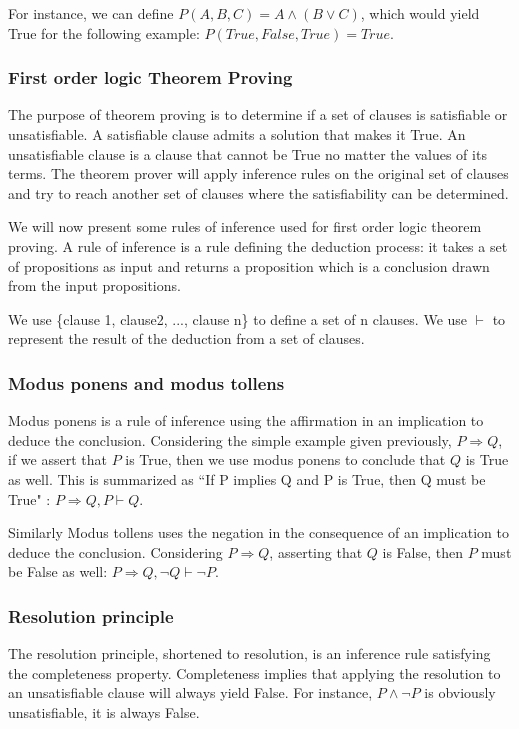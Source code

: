 For instance, we can define $P(A,B,C) = A \wedge (B \vee C)$, which would yield True for the following example: $P(True,False,True)=True$.

\subsubsection{First order logic Theorem Proving}
The purpose of theorem proving is to determine if a set of clauses is satisfiable or unsatisfiable.
A satisfiable clause admits a solution that makes it True.
An unsatisfiable clause is a clause that cannot be True no matter the values of its terms.
The theorem prover will apply inference rules on the original set of clauses and try to reach another set of clauses where the satisfiability can be determined.

We will now present some rules of inference used for first order logic theorem proving.
A rule of inference is a rule defining the deduction process: it takes a set of propositions as input and returns a proposition which is a conclusion drawn from the input propositions.

We use \{clause 1, clause2, ..., clause n\} to define a set of n clauses.
We use $\vdash$ to represent the result of the deduction from a set of clauses.

\subsubsection{Modus ponens and modus tollens}
Modus ponens is a rule of inference using the affirmation in an implication to deduce the conclusion.
Considering the simple example given previously, $P \Rightarrow Q$, if we assert that $P$ is True, then we use modus ponens to conclude that $Q$ is True as well. This is summarized as ``If P implies Q and P is True, then Q must be True" : $P \Rightarrow Q, P \vdash Q$.

Similarly Modus tollens uses the negation in the consequence of an implication to deduce the conclusion.
Considering $P \Rightarrow Q$, asserting that $Q$ is False, then $P$ must be False as well: $P \Rightarrow Q, \neg Q \vdash \neg P$.

\subsubsection{Resolution principle}
The resolution principle, shortened to resolution, is an inference rule satisfying the completeness property. Completeness implies that applying the resolution to an unsatisfiable clause will always yield False. 
For instance, $P \wedge \neg P$ is obviously unsatisfiable, \ie it is always False.

